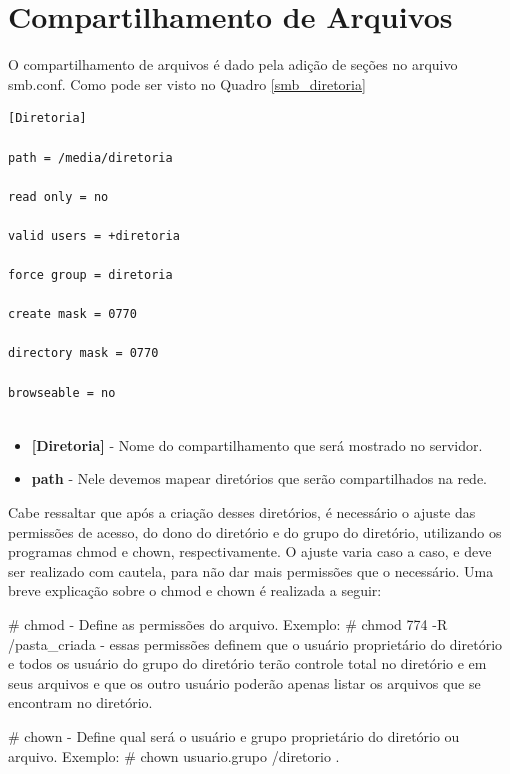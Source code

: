 \section{Compartilhamento de Arquivos}

O compartilhamento de arquivos é dado pela adição de seções no arquivo smb.conf. Como pode ser visto no Quadro \ref{smb_diretoria}\\

\begin{lstlisting}[caption=Criação de uma seção para compartilhamento de arquivos,label={smb_diretoria}]
[Diretoria]

path = /media/diretoria

read only = no

valid users = +diretoria

force group = diretoria

create mask = 0770

directory mask = 0770

browseable = no
	
\end{lstlisting}

\begin{itemize}
	\item \textbf{[Diretoria]} - Nome do compartilhamento que será mostrado no servidor.
	\item \textbf{path} - Nele devemos mapear diretórios que serão compartilhados na rede. 
\end{itemize}

	Cabe ressaltar que após a criação desses diretórios, é necessário o ajuste das permissões de acesso, do dono do diretório e do grupo do diretório, utilizando os programas chmod e chown, respectivamente. O ajuste varia caso a caso, e deve ser realizado com cautela, para não dar mais permissões que o necessário. Uma breve explicação sobre o chmod e chown é realizada a seguir:

\# chmod - Define as permissões do arquivo. Exemplo: \# chmod 774 -R /pasta\_criada - essas permissões definem que o usuário proprietário do diretório e todos os usuário do grupo do diretório terão controle total no diretório e em seus arquivos e que os outro usuário poderão apenas listar os arquivos que se encontram no diretório.

\# chown - Define qual será o usuário e grupo proprietário do diretório ou arquivo. Exemplo: \# chown usuario.grupo /diretorio .

